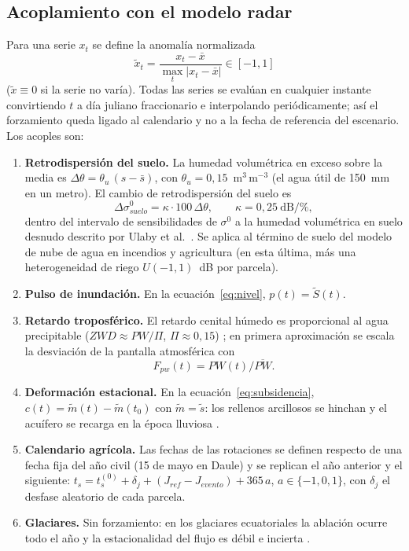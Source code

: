 \documentclass[11pt,a4paper]{article}
\begin{document}
\subsection{Acoplamiento con el modelo radar}\label{sec:acople}
Para una serie $x_t$ se define la anomalía normalizada
\begin{equation}
  \tilde x_t = \frac{x_t - \bar x}{\max_t|x_t - \bar x|}\in[-1,1]
\end{equation}
($\tilde x\equiv 0$ si la serie no varía). Todas las series se evalúan en cualquier instante
convirtiendo $t$ a día juliano fraccionario e interpolando periódicamente; así el forzamiento queda
ligado al calendario y no a la fecha de referencia del escenario. Los acoples son:
\begin{enumerate}
  \item \textbf{Retrodispersión del suelo.} La humedad volumétrica en exceso sobre la media es
        $\Delta\theta = \theta_u\,(s - \bar s)$, con $\theta_u = 0{,}15$~m$^3$\,m$^{-3}$ (el agua útil de
        150~mm en un metro). El cambio de retrodispersión del suelo es
        \begin{equation}\label{eq:dsigma}
          \Delta\sigma^0_{suelo} = \kappa\cdot 100\,\Delta\theta,\qquad \kappa = 0{,}25~\mathrm{dB}/\%,
        \end{equation}
        dentro del intervalo de sensibilidades de $\sigma^0$ a la humedad volumétrica en suelo desnudo
        descrito por Ulaby et al.\ \cite{ulaby1978,ulaby2014}. Se aplica al término de suelo del modelo de
        nube de agua en incendios y agricultura (en esta última, más una heterogeneidad de riego
        $U(-1,1)$~dB por parcela).
  \item \textbf{Pulso de inundación.} En la ecuación~\eqref{eq:nivel}, $p(t) = \tilde S(t)$.
  \item \textbf{Retardo troposférico.} El retardo cenital húmedo es proporcional al agua precipitable
        ($ZWD\approx PW/\Pi$, $\Pi\approx 0{,}15$) \cite{bevis1992}; en primera aproximación se escala la
        desviación de la pantalla atmosférica con
        \begin{equation}\label{eq:fpw}
          F_{pw}(t) = PW(t)/\overline{PW}.
        \end{equation}
  \item \textbf{Deformación estacional.} En la ecuación~\eqref{eq:subsidencia}, $c(t) = \tilde m(t) -
        \tilde m(t_0)$ con $\tilde m = \tilde s$: los rellenos arcillosos se hinchan y el acuífero se
        recarga en la época lluviosa \cite{galloway2011}.
  \item \textbf{Calendario agrícola.} Las fechas de las rotaciones se definen respecto de una fecha fija
        del año civil (15 de mayo en Daule) y se replican el año anterior y el siguiente:
        $t_s = t_s^{(0)} + \delta_j + (J_{ref} - J_{evento}) + 365\,a$, $a\in\{-1,0,1\}$, con $\delta_j$ el
        desfase aleatorio de cada parcela.
  \item \textbf{Glaciares.} Sin forzamiento: en los glaciares ecuatoriales la ablación ocurre todo el
        año y la estacionalidad del flujo es débil e incierta \cite{francou2004,rabatel2013}.
\end{enumerate}
\end{document}
